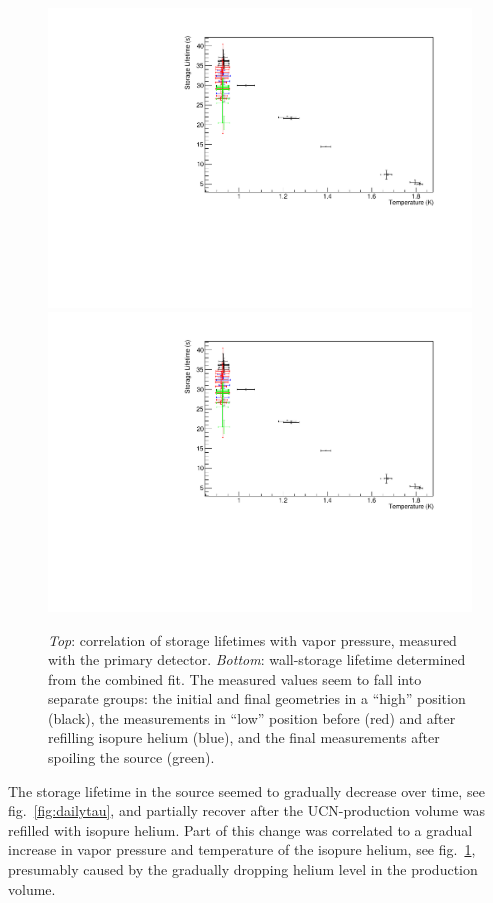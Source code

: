 \documentclass[10pt,letterpaper]{article}
\begin{document}
\begin{figure}
\centering
\includegraphics[width=\textwidth,page=2]{../storagelifetime/tauvstemp.pdf}
\includegraphics[width=\textwidth,page=3]{../storagelifetime/tauvstemp.pdf}
\caption{\textit{Top}: correlation of storage lifetimes with vapor pressure, measured with the primary detector. \textit{Bottom}: wall-storage lifetime determined from the combined fit. The measured values seem to fall into separate groups: the initial and final geometries in a ``high'' position (black), the measurements in ``low'' position before (red) and after refilling isopure helium (blue), and the final measurements after spoiling the source (green).}
\label{fig:tauvstemp}
\end{figure}

The storage lifetime in the source seemed to gradually decrease over time, see fig.~\ref{fig:dailytau}, and partially recover after the UCN-production volume was refilled with isopure helium. Part of this change was correlated to a gradual increase in vapor pressure and temperature of the isopure helium, see fig.~\ref{fig:tauvstemp}, presumably caused by the gradually dropping helium level in the production volume.
\end{document}
